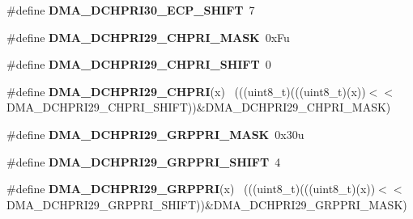\begin{DoxyCompactItemize}
\item 
\hypertarget{group___d_m_a___register___masks_gabdee377aecd43feed1f7dd458f548a35}{}\#define {\bfseries D\+M\+A\+\_\+\+D\+C\+H\+P\+R\+I30\+\_\+\+E\+C\+P\+\_\+\+S\+H\+I\+F\+T}~7\label{group___d_m_a___register___masks_gabdee377aecd43feed1f7dd458f548a35}

\item 
\hypertarget{group___d_m_a___register___masks_gab60691c1ac77f1cd956f5b78a0584322}{}\#define {\bfseries D\+M\+A\+\_\+\+D\+C\+H\+P\+R\+I29\+\_\+\+C\+H\+P\+R\+I\+\_\+\+M\+A\+S\+K}~0x\+Fu\label{group___d_m_a___register___masks_gab60691c1ac77f1cd956f5b78a0584322}

\item 
\hypertarget{group___d_m_a___register___masks_ga3eb6fe9007e6f8b3c26278b358bead00}{}\#define {\bfseries D\+M\+A\+\_\+\+D\+C\+H\+P\+R\+I29\+\_\+\+C\+H\+P\+R\+I\+\_\+\+S\+H\+I\+F\+T}~0\label{group___d_m_a___register___masks_ga3eb6fe9007e6f8b3c26278b358bead00}

\item 
\hypertarget{group___d_m_a___register___masks_gab1be9ad322c8cbb207b11ec371e35d44}{}\#define {\bfseries D\+M\+A\+\_\+\+D\+C\+H\+P\+R\+I29\+\_\+\+C\+H\+P\+R\+I}(x)                                    ~(((uint8\+\_\+t)(((uint8\+\_\+t)(x))$<$$<$D\+M\+A\+\_\+\+D\+C\+H\+P\+R\+I29\+\_\+\+C\+H\+P\+R\+I\+\_\+\+S\+H\+I\+F\+T))\&D\+M\+A\+\_\+\+D\+C\+H\+P\+R\+I29\+\_\+\+C\+H\+P\+R\+I\+\_\+\+M\+A\+S\+K)\label{group___d_m_a___register___masks_gab1be9ad322c8cbb207b11ec371e35d44}

\item 
\hypertarget{group___d_m_a___register___masks_ga2fffc256dae7c4c810d8e72f2bb422b2}{}\#define {\bfseries D\+M\+A\+\_\+\+D\+C\+H\+P\+R\+I29\+\_\+\+G\+R\+P\+P\+R\+I\+\_\+\+M\+A\+S\+K}~0x30u\label{group___d_m_a___register___masks_ga2fffc256dae7c4c810d8e72f2bb422b2}

\item 
\hypertarget{group___d_m_a___register___masks_ga9299745ba9ac23145224b838a3e7752f}{}\#define {\bfseries D\+M\+A\+\_\+\+D\+C\+H\+P\+R\+I29\+\_\+\+G\+R\+P\+P\+R\+I\+\_\+\+S\+H\+I\+F\+T}~4\label{group___d_m_a___register___masks_ga9299745ba9ac23145224b838a3e7752f}

\item 
\hypertarget{group___d_m_a___register___masks_ga7bc37ff7826fc2d4029b6f9f5895b383}{}\#define {\bfseries D\+M\+A\+\_\+\+D\+C\+H\+P\+R\+I29\+\_\+\+G\+R\+P\+P\+R\+I}(x)                                  ~(((uint8\+\_\+t)(((uint8\+\_\+t)(x))$<$$<$D\+M\+A\+\_\+\+D\+C\+H\+P\+R\+I29\+\_\+\+G\+R\+P\+P\+R\+I\+\_\+\+S\+H\+I\+F\+T))\&D\+M\+A\+\_\+\+D\+C\+H\+P\+R\+I29\+\_\+\+G\+R\+P\+P\+R\+I\+\_\+\+M\+A\+S\+K)\label{group___d_m_a___register___masks_ga7bc37ff7826fc2d4029b6f9f5895b383}


\end{DoxyCompactItemize}
